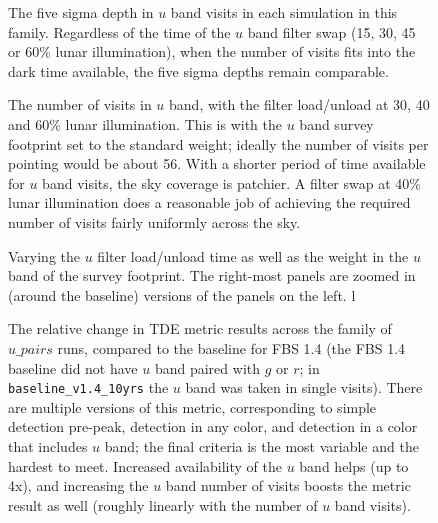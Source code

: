 \begin{figure}
\caption{The five sigma depth in $u$ band visits in each simulation in this family. Regardless of the time of the $u$ band filter swap (15, 30, 45 or 60\% lunar illumination), when the number of visits fits into the dark time available, the five sigma depths remain comparable.}
\label{fig:u_band_fiveSigmaDepth}
\end{figure}

\begin{figure}
\caption{The number of visits in $u$ band, with the filter load/unload at 30, 40 and 60\% lunar illumination. This is with the $u$ band survey footprint set to the standard weight; ideally the number of visits per pointing would be about 56. With a shorter period of time available for $u$ band visits, the sky coverage is patchier. A filter swap at 40\% lunar illumination does a reasonable job of achieving the required number of visits fairly uniformly across the sky.}
\label{fig:nvisits_ubandswap}
\end{figure}

\begin{figure}
\caption{Varying the $u$ filter load/unload time as well as the weight in the $u$ band of the survey footprint. The right-most panels are zoomed in (around the baseline) versions of the panels on the left. l }
\label{fig:radar_ubandswap}
\end{figure}

\begin{figure}
\caption{The relative change in TDE metric results across the family of $u\_pairs$ runs, compared to the baseline for FBS 1.4 (the FBS 1.4 baseline did not have $u$ band paired with $g$ or $r$; in {\tt baseline\_v1.4\_10yrs} the $u$ band was taken in single visits). There are multiple versions of this metric, corresponding to simple detection pre-peak, detection in any color, and detection in a color that includes $u$ band; the final criteria is the most variable and the hardest to meet. Increased availability of the $u$ band helps (up to 4x), and increasing the $u$ band number of visits boosts the metric result as well (roughly linearly with the number of $u$ band visits).}
\label{fig:upairs_TDE}
\end{figure}


